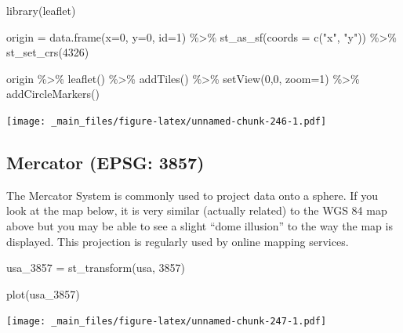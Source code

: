 \documentclass[
]{book}
\newenvironment{Shaded}{\begin{snugshade}}{\end{snugshade}}
\newcommand{\AttributeTok}[1]{\textcolor[rgb]{0.77,0.63,0.00}{#1}}
\newcommand{\DecValTok}[1]{\textcolor[rgb]{0.00,0.00,0.81}{#1}}
\newcommand{\FunctionTok}[1]{\textcolor[rgb]{0.00,0.00,0.00}{#1}}
\newcommand{\NormalTok}[1]{#1}
\newcommand{\OtherTok}[1]{\textcolor[rgb]{0.56,0.35,0.01}{#1}}
\newcommand{\SpecialCharTok}[1]{\textcolor[rgb]{0.00,0.00,0.00}{#1}}
\newcommand{\StringTok}[1]{\textcolor[rgb]{0.31,0.60,0.02}{#1}}
\begin{document}
\begin{Shaded}
\begin{Highlighting}[]
\FunctionTok{library}\NormalTok{(leaflet)}

\NormalTok{origin }\OtherTok{=} \FunctionTok{data.frame}\NormalTok{(}\AttributeTok{x=}\DecValTok{0}\NormalTok{, }\AttributeTok{y=}\DecValTok{0}\NormalTok{, }\AttributeTok{id=}\DecValTok{1}\NormalTok{) }\SpecialCharTok{\%\textgreater{}\%}
  \FunctionTok{st\_as\_sf}\NormalTok{(}\AttributeTok{coords =} \FunctionTok{c}\NormalTok{(}\StringTok{"x"}\NormalTok{, }\StringTok{"y"}\NormalTok{)) }\SpecialCharTok{\%\textgreater{}\%}
  \FunctionTok{st\_set\_crs}\NormalTok{(}\DecValTok{4326}\NormalTok{)}

\NormalTok{origin }\SpecialCharTok{\%\textgreater{}\%} 
  \FunctionTok{leaflet}\NormalTok{() }\SpecialCharTok{\%\textgreater{}\%}
  \FunctionTok{addTiles}\NormalTok{() }\SpecialCharTok{\%\textgreater{}\%}
  \FunctionTok{setView}\NormalTok{(}\DecValTok{0}\NormalTok{,}\DecValTok{0}\NormalTok{, }\AttributeTok{zoom=}\DecValTok{1}\NormalTok{) }\SpecialCharTok{\%\textgreater{}\%}
  \FunctionTok{addCircleMarkers}\NormalTok{() }
\end{Highlighting}
\end{Shaded}

\texttt{[image: \_main\_files/figure-latex/unnamed-chunk-246-1.pdf]}

\hypertarget{mercator-epsg-3857}{%
\subsection{Mercator (EPSG: 3857)}\label{mercator-epsg-3857}}

The Mercator System is commonly used to project data onto a sphere. If you look at the map below, it is very similar (actually related) to the WGS 84 map above but you may be able to see a slight ``dome illusion'' to the way the map is displayed. This projection is regularly used by online mapping services.

\begin{Shaded}
\begin{Highlighting}[]
\NormalTok{usa\_3857 }\OtherTok{=} \FunctionTok{st\_transform}\NormalTok{(usa, }\DecValTok{3857}\NormalTok{)}

\FunctionTok{plot}\NormalTok{(usa\_3857)}
\end{Highlighting}
\end{Shaded}

\texttt{[image: \_main\_files/figure-latex/unnamed-chunk-247-1.pdf]}
\end{document}

